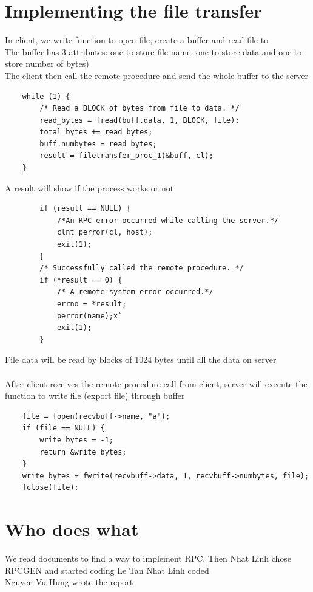 \documentclass[12pt]{article}
\begin{document}
  \section{Implementing the file transfer}
    In client, we write function to open file, create a buffer and read file to  \\
    The buffer has 3 attributes: one to store file name, one to store data and one to store number of bytes) \\
    The client then call the remote procedure and send the whole buffer to the server \\
    \begin{verbatim}
    while (1) {
    	/* Read a BLOCK of bytes from file to data. */
        read_bytes = fread(buff.data, 1, BLOCK, file);
        total_bytes += read_bytes;
        buff.numbytes = read_bytes;
        result = filetransfer_proc_1(&buff, cl);
    }
    \end{verbatim}
    A result will show if the process works or not
    \begin{verbatim}
        if (result == NULL) {
            /*An RPC error occurred while calling the server.*/
            clnt_perror(cl, host);
            exit(1);
        }
        /* Successfully called the remote procedure. */
        if (*result == 0) {
            /* A remote system error occurred.*/
            errno = *result;
            perror(name);x`
            exit(1);
        }
    \end{verbatim}
    File data will be read by blocks of 1024 bytes until all the data on server  \\
     \\
    After client receives the remote procedure call from client, server will execute the function to write file (export file) through buffer
    \begin{verbatim}
    file = fopen(recvbuff->name, "a");
    if (file == NULL) {
        write_bytes = -1;
        return &write_bytes;
    }
    write_bytes = fwrite(recvbuff->data, 1, recvbuff->numbytes, file);
    fclose(file);
    \end{verbatim}
 
    \section{Who does what}
    We read documents to find a way to implement RPC. Then Nhat Linh chose RPCGEN and started coding
Le Tan Nhat Linh coded\\
Nguyen Vu Hung wrote the report
\end{document}
